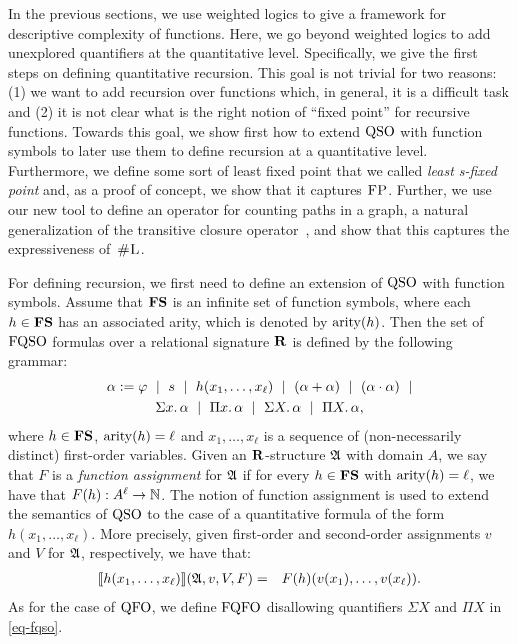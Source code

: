 
In the previous sections, we use weighted logics to give a framework for descriptive complexity of functions. Here, we go beyond weighted logics to add unexplored quantifiers at the quantitative level. Specifically, we give the first steps on defining quantitative recursion. This goal is not trivial for two reasons: (1) we want to add recursion over functions which, in general, it is a difficult task and (2) it is not clear what is the right notion of ``fixed point'' for recursive functions. 
Towards this goal, we show first how to extend ${\rm QSO}$ with function symbols to later use them to define recursion at a quantitative level. Furthermore,  we define some sort of least fixed point that we called \emph{least s-fixed point} and, as a proof of concept, we show that it captures $\text{\sc FP}$.
Further, we use our new tool to define an operator for counting paths in a graph, a natural generalization of the transitive closure operator~\cite{immerman1999descriptive}, and show that this captures the expressiveness of~$\text{\sc \#L}$.

For defining recursion, we first need to define an extension of ${\rm QSO}$ with function symbols. Assume that $\mathbf{FS}$ is an infinite set of function symbols, where each $h \in \mathbf{FS}$ has an associated arity, which is denoted by ${\rm arity}(h)$. Then the set of ${\rm FQSO}$ formulas over a relational signature $\mathbf{R}$ is defined by the following grammar:
\begin{multline}
\label{eq-fqso}
	\alpha := \varphi \ \mid \  s \  \mid \  h(x_1, \ldots, x_\ell) \  \mid \
	(\alpha \add \alpha) \  \mid\  (\alpha \mult \alpha) \  \mid \\  
	\sa{x} \alpha \  \mid \
	\pa{x} \alpha \  \mid \
	\sa{X} \alpha \  \mid \
	\pa{X} \alpha,
\end{multline}
where $h \in \mathbf{FS}$, ${\rm arity}(h) = \ell$ and $x_1, \ldots, x_\ell$ is a sequence of (non-necessarily distinct) first-order variables. Given an $\mathbf{R}$-structure $\mathfrak{A}$ with domain $A$, we say that $F$ is a \emph{function assignment} for $\mathfrak{A}$ if for every $h \in \mathbf{FS}$ with ${\rm arity}(h) = \ell$, we have that $F(h) :  A^\ell \to \mathbb{N}$. The notion of function assignment is used to extend the semantics of ${\rm QSO}$ to the case of a quantitative formula of the form $h(x_1, \ldots, x_\ell)$. More precisely, given first-order and second-order assignments $v$ and $V$ for $\mathfrak{A}$, respectively, 
we have that:
\begin{eqnarray*}
{\llbracket{}{h(x_1, \ldots, x_\ell)}\rrbracket}(\mathfrak{A},v,V,F) & = & F(h)(v(x_1),\ldots, v(x_\ell)).
\end{eqnarray*}
As for the case of ${\rm QFO}$, we define ${\rm FQFO}$ disallowing quantifiers $\Sigma X$ and $\Pi X$ in \eqref{eq-fqso}.

